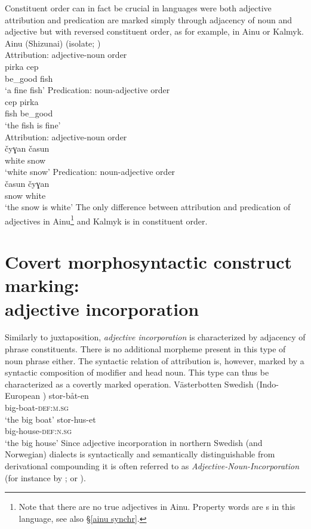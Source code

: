 Constituent order can in fact be crucial in languages were both adjective attribution and predication are marked simply through adjacency of noun and adjective but with reversed constituent order, as for example, in Ainu or Kalmyk. 
\ea
{}
\rm{Ainu (Shizunai) (isolate; \citealt{refsing1986})}\\
\ea \rm{Attribution: adjective-noun order}\\
\gll	pirka cep\\
	be\_good fish\\
\glt	‘a fine fish’
\ex \rm{Predication: noun-adjective order}\\
\gll	cep pirka\\
	fish be\_good\\
\glt	‘the fish is fine’
\z
\z
\ea
{}\\
\ea \rm{Attribution: adjective-noun order}\\
\gll	čyɣan časun\\
	white snow\\
\glt	‘white snow’
\ex \rm{Predication: noun-adjective order}\\
\gll	časun čyɣan\\
	snow white\\
\glt	‘the snow is white’
\z
\z
The only difference between attribution and predication of adjectives in Ainu\footnote{Note that there are no true adjectives in Ainu. Property words are s in this language, see also \S\ref{ainu synchr}.} and Kalmyk is in constituent order.

\section[Incorporation]{Covert morphosyntactic construct marking:\\adjective incorporation} \label{attr incorporation}
Similarly to juxtaposition, \emph{adjective incorporation} is characterized by adjacency of phrase constituents. There is no additional morpheme present in this type of noun phrase either. The syntactic relation of attribution is, however, marked by a syntactic composition of modifier and head noun. This type can thus be characterized as a covertly marked operation.
\ea 
\label{bondska compound}
\rm{Västerbotten Swedish (Indo-European \citealt{larsson1929})}
\ea
\gll 	stor-båt-en\\	
	big-boat-\textsc{def:m.sg}\\
\glt	‘the big boat’
\ex
\gll 	stor-hus-et\\
	big-house-\textsc{def:n.sg}\\
\glt	‘the big house’
\z
\z
Since adjective incorporation in northern Swedish (and Norwegian) dialects is syntactically and semantically distinguishable from derivational compounding it is often referred to as \emph{Adjective-Noun-Incorporation} (for instance by \citealt{sandstrom-etal2003}; \citealt[127–129]{dahl2015a} or \citealt[61]{julien2005}).

